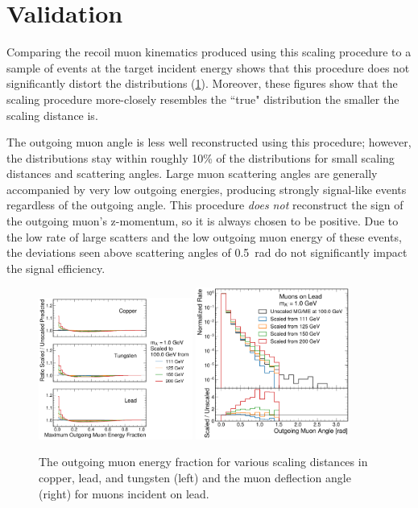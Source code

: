 \section{Validation}
\label{sec:validation}

Comparing the recoil muon kinematics produced using this scaling procedure to a sample of \mg events at the target incident energy shows that this procedure does not significantly distort the distributions (\cref{fig:dbrem_validation}).
Moreover, these figures show that the scaling procedure more-closely resembles the ``true" \mg distribution the smaller the scaling distance is.

The outgoing muon angle is less well reconstructed using this procedure; however, the distributions stay within roughly 10\% of the \mg distributions for small scaling distances and scattering angles.
Large muon scattering angles are generally accompanied by very low outgoing energies, producing strongly signal-like events regardless of the outgoing angle. 
This procedure \emph{does not} reconstruct the sign of the outgoing muon's z-momentum, so it is always chosen to be positive. 
Due to the low rate of large scatters and the low outgoing muon energy of these events, the deviations seen above scattering angles of \SI{0.5}{\radian} do not significantly impact the signal efficiency.

\begin{figure}[!htbp]
    \centering
    \includegraphics[width=0.45\textwidth]{figures/muon_efrac_cumulative_ratio.pdf}
    \hspace{0.01\textwidth}
    \includegraphics[width=0.45\textwidth]{figures/muon_lead_ang.pdf}
    \caption[
        Validation of simulated \dbrem kinematics.
    ]{
        The outgoing muon energy fraction for various scaling distances in copper, lead, and tungsten (left) and the muon deflection angle (right) for muons incident on lead.
    }
    \label{fig:dbrem_validation}
\end{figure}
